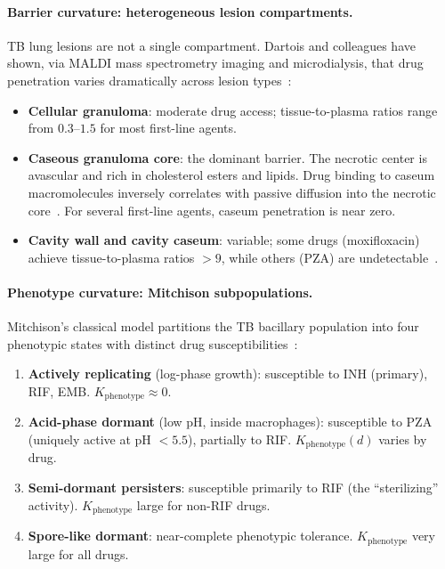 \documentclass[11pt]{article}
\theoremstyle{plain}
\theoremstyle{definition}
\newcommand{\Kpheno}{K_{\mathrm{phenotype}}}
\begin{document}
\paragraph{Barrier curvature: heterogeneous lesion compartments.}
TB lung lesions are not a single compartment. Dartois and
colleagues have shown, via MALDI mass spectrometry imaging and
microdialysis, that drug penetration varies dramatically across
lesion types~\cite{Dartois2014, Prideaux2015, Kjellsson2012}:
\begin{itemize}
  \item \textbf{Cellular granuloma}: moderate drug access;
    tissue-to-plasma ratios range from $0.3$--$1.5$ for most
    first-line agents.
  \item \textbf{Caseous granuloma core}: the dominant barrier.
    The necrotic center is avascular and rich in cholesterol esters
    and lipids. Drug binding to caseum macromolecules inversely
    correlates with passive diffusion into the necrotic
    core~\cite{Sarathy2016}. For several first-line agents,
    caseum penetration is near zero.
  \item \textbf{Cavity wall and cavity caseum}: variable; some
    drugs (moxifloxacin) achieve tissue-to-plasma ratios $> 9$,
    while others (PZA) are undetectable~\cite{Kjellsson2012}.
\end{itemize}

\paragraph{Phenotype curvature: Mitchison subpopulations.}
Mitchison's classical model partitions the TB bacillary population
into four phenotypic states with distinct drug
susceptibilities~\cite{Mitchison1985}:
\begin{enumerate}[label=(\alph*)]
  \item \textbf{Actively replicating} (log-phase growth):
    susceptible to INH (primary), RIF, EMB. $\Kpheno \approx 0$.
  \item \textbf{Acid-phase dormant} (low pH, inside macrophages):
    susceptible to PZA (uniquely active at pH $< 5.5$),
    partially to RIF. $\Kpheno(d)$ varies by drug.
  \item \textbf{Semi-dormant persisters}: susceptible primarily
    to RIF (the ``sterilizing'' activity). $\Kpheno$ large for
    non-RIF drugs.
  \item \textbf{Spore-like dormant}: near-complete phenotypic
    tolerance. $\Kpheno$ very large for all drugs.
\end{enumerate}
\end{document}
